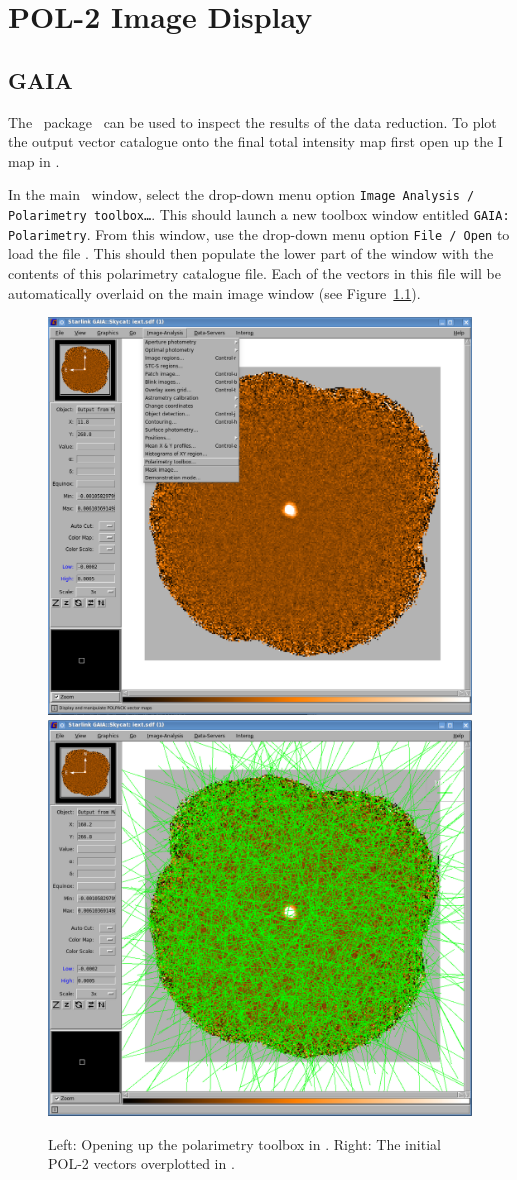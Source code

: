 \chapter{POL-2 Image Display}
\label{sec:display}

\section{GAIA}

The \starlink\ package \gaia\ can be used to inspect the results of
the data reduction.  To plot the output vector catalogue onto the
final total intensity map first open up the I map in \GAIA.

\begin{terminalv}
\end{terminalv}


In the main \GAIA\ window, select the drop-down menu option
\texttt{Image Analysis / Polarimetry toolbox…}. This should launch a
new toolbox window entitled \texttt{GAIA: Polarimetry}. From this window, use
the drop-down menu option \texttt{File / Open} to load the file
. This should then populate the lower part of the window
with the contents of this polarimetry catalogue file.  Each of the vectors
in this file will be automatically overlaid on the main image window
(see Figure~\ref{fig:gaiavectorsopen}).

\begin{figure}[t!]
\begin{center}
\includegraphics[width=0.46\linewidth]{sc22-gaia-plot-vectors-1.png}
\includegraphics[width=0.46\linewidth]{sc22-gaia-plot-vectors-3.png}
\caption [Over Plotting Vectors in GAIA]{
  Left: Opening up the polarimetry toolbox in \GAIA. Right: The initial POL-2
  vectors overplotted in \GAIA.
\label{fig:gaiavectorsopen}
}
\end{center}
\end{figure}

